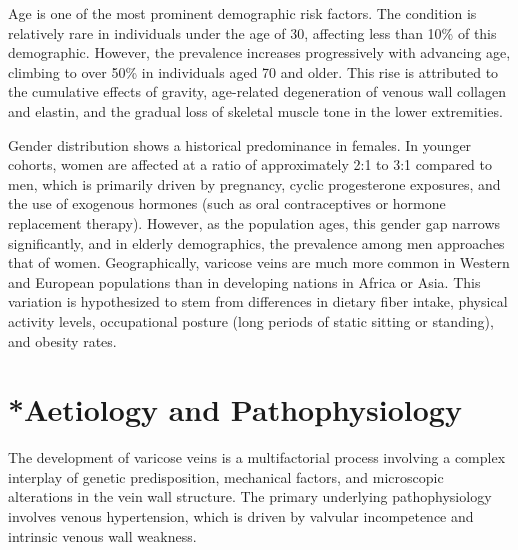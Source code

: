 Age is one of the most prominent demographic risk factors. The condition is relatively rare in individuals under the age of 30, affecting less than 10\% of this demographic. However, the prevalence increases progressively with advancing age, climbing to over 50\% in individuals aged 70 and older. This rise is attributed to the cumulative effects of gravity, age-related degeneration of venous wall collagen and elastin, and the gradual loss of skeletal muscle tone in the lower extremities.

Gender distribution shows a historical predominance in females. In younger cohorts, women are affected at a ratio of approximately 2:1 to 3:1 compared to men, which is primarily driven by pregnancy, cyclic progesterone exposures, and the use of exogenous hormones (such as oral contraceptives or hormone replacement therapy). However, as the population ages, this gender gap narrows significantly, and in elderly demographics, the prevalence among men approaches that of women. Geographically, varicose veins are much more common in Western and European populations than in developing nations in Africa or Asia. This variation is hypothesized to stem from differences in dietary fiber intake, physical activity levels, occupational posture (long periods of static sitting or standing), and obesity rates.

\section{*{Aetiology and Pathophysiology}}
The development of varicose veins is a multifactorial process involving a complex interplay of genetic predisposition, mechanical factors, and microscopic alterations in the vein wall structure. The primary underlying pathophysiology involves venous hypertension, which is driven by valvular incompetence and intrinsic venous wall weakness.

